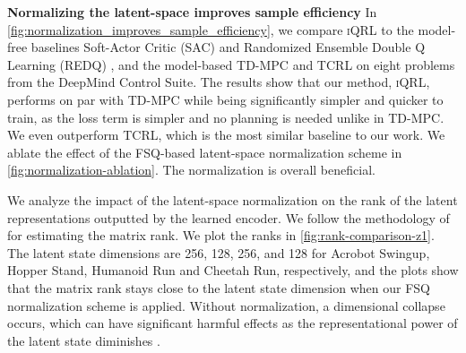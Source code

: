 \documentclass{article}
\theoremstyle{plain}
\theoremstyle{definition}
\theoremstyle{remark}
\newcommand{\our}{\textsc{iQRL}\xspace}
\begin{document}




\textbf{Normalizing the latent-space improves sample efficiency}
In \cref{fig:normalization_improves_sample_efficiency}, we compare \our to the model-free baselines Soft-Actor Critic (SAC) \cite{haarnojaSoft2018} and Randomized Ensemble Double Q Learning (REDQ) \cite{chenRandomizedEnsembledDouble2021}, and the model-based TD-MPC \cite{hansenTemporalDifferenceLearning2022} and TCRL \cite{zhaoSimplifiedTemporalConsistency2023} on eight problems from the DeepMind Control Suite. The results show that our method, \our, performs on par with TD-MPC while being significantly simpler and quicker to train, as the loss term is simpler and no planning is needed unlike in TD-MPC. We even outperform TCRL, which is the most similar baseline to our work. We ablate the effect of the FSQ-based latent-space normalization scheme in \cref{fig:normalization-ablation}. The normalization is overall beneficial. 

We analyze the impact of the latent-space normalization on the rank of the latent representations outputted by the learned encoder. We follow the methodology of \citet{ni2024bridging} for estimating the matrix rank. We plot the ranks in \cref{fig:rank-comparison-z1}. The latent state dimensions are 256, 128, 256, and 128 for Acrobot Swingup, Hopper Stand, Humanoid Run and Cheetah Run, respectively, and the plots show that the matrix rank stays close to the latent state dimension when our FSQ normalization scheme is applied. Without normalization, a dimensional collapse occurs, which can have significant harmful effects as the representational power of the latent state diminishes \cite{jingUnderstandingDimensionalCollapse2021}.
\end{document}
